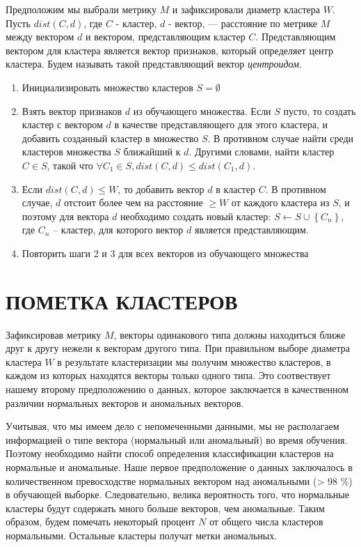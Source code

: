 \documentclass[12pt,a4paper]{article}
\begin{document}
Предположим мы выбрали метрику $M$ и зафиксировали диаметр кластера $W$. 
Пусть $dist(C, d)$, где $C$ - кластер, $d$ - вектор, --- расстояние по метрике
$M$ между вектором $d$ и вектором, представляющим кластер $C$.
Представляющим вектором для кластера является вектор признаков, который определяет
центр кластера. Будем называть такой представляющий вектор \textit{центроидом}.

\begin{enumerate}

\item Инициализировать множество кластеров $S = \emptyset $

\item Взять вектор признаков $d$ из обучающего множества. Если $S$ пусто, то создать
кластер с вектором $d$ в качестве представляющего для этого кластера, и добавить
созданный кластер в множество $S$. В противном случае найти среди кластеров
 множества $S$ ближайший к $d$. Другими словами, найти кластер $C \in S$, такой что 
 $\forall C_1 \in S, dist(C, d) \leq dist(C_1, d)$.
 
\item Если $dist(C, d) \leq W$, то добавить вектор $d$ в кластер $C$. В противном 
случае, $d$ отстоит более чем на расстояние $\geq W$ от каждого кластера из $S$,
и поэтому для вектора $d$ необходимо создать новый кластер: 
$S \longleftarrow S \cup \left\{C_n\right\}$, где $C_n$ -- кластер, для которого
вектор $d$ является представляющим.

\item Повторить шаги 2 и 3 для всех векторов из обучающего множества

\end{enumerate}

\section{ПОМЕТКА КЛАСТЕРОВ}

Зафиксировав метрику $M$, векторы одинакового типа должны находиться 
ближе друг к другу нежели к векторам другого типа. При правильном выборе
диаметра кластера $W$ в результате кластеризации мы получим множество кластеров, 
в каждом из которых находятся векторы только одного типа. Это соотвествует нашему
второму предположению о данных, которое заключается в качественном различии
нормальных векторов и аномальных векторов.

Учитывая, что мы имеем дело с непомеченными данными, мы не располагаем информацией
о типе вектора (нормальный или аномальный) во время обучения. Поэтому необходимо
найти способ определения классификации кластеров на нормальные и аномальные.
Наше первое предположение о данных заключалось в количественном превосходстве
нормальных вектором над аномальными (> 98 \%) в обучающей выборке. Следовательно, 
велика вероятность того, что нормальные кластеры будут содержать много больше векторов, 
чем аномальные. Таким образом, будем помечать некоторый процент $N$ от общего 
числа кластеров нормальными. Остальные кластеры получат метки аномальных.
\end{document}
